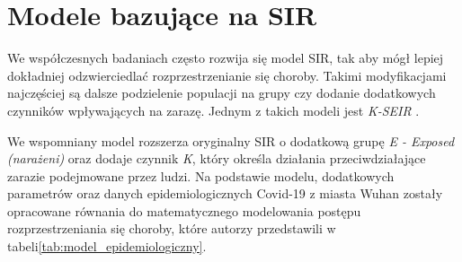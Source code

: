 \section{\textbf{Modele bazujące na SIR}}

We współczesnych badaniach często rozwija się model SIR, tak aby mógł lepiej dokładniej odzwierciedlać rozprzestrzenianie się choroby. Takimi modyfikacjami najczęściej są dalsze podzielenie populacji na grupy czy dodanie dodatkowych czynników wpływających na zarazę. Jednym z takich modeli jest \textit {K-SEIR}
\cite{bib:artykul}.

We wspomniany model rozszerza oryginalny SIR o dodatkową grupę \textit { E - Exposed (narażeni)} oraz dodaje czynnik \textit {K}, który określa działania przeciwdziałające zarazie podejmowane przez ludzi. Na podstawie modelu, dodatkowych parametrów oraz danych epidemiologicznych Covid-19 z miasta Wuhan zostały opracowane równania do matematycznego modelowania postępu rozprzestrzeniania się choroby, które autorzy przedstawili w tabeli\ref{tab:model_epidemiologiczny}.

